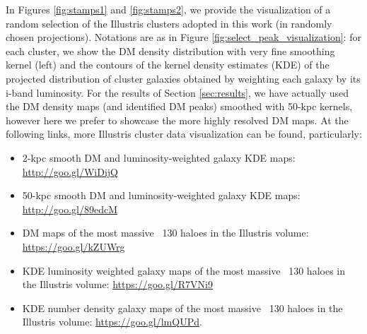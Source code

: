 \documentclass[usenatbib]{mn2e}
\begin{document}
{In Figures \ref{fig:stamps1} and \ref{fig:stamps2}, we provide the visualization of a random selection of the Illustris clusters adopted in this work (in randomly chosen projections). Notations are as in Figure \ref{fig:select_peak_visualization}: for each cluster, we show the DM density distribution with very fine smoothing kernel (left) and the contours of the kernel density estimates (KDE) of the projected distribution of cluster galaxies obtained by weighting each galaxy by its i-band luminosity. For the results of Section \ref{sec:results}, we have actually used the DM density maps (and identified DM peaks) smoothed with 50-kpc kernels, however here we prefer to showcase the more highly resolved DM maps. At the following links, more Illustris cluster data visualization can be found, particularly:

\begin{itemize}
\item 2-kpc smooth DM and luminosity-weighted galaxy KDE maps: \href{http://goo.gl/WiDijQ}{http://goo.gl/WiDijQ} 
\item 50-kpc smooth DM and luminosity-weighted galaxy KDE maps: \href{http://goo.gl/89edcM}{http://goo.gl/89edcM}
\item DM maps of the most massive ~130 haloes in the Illustris volume: \href{https://goo.gl/kZUWrg}{https://goo.gl/kZUWrg}
\item KDE luminosity weighted galaxy maps of the most massive ~130 haloes in the Illustris volume: \href{https://goo.gl/R7VNi9}{https://goo.gl/R7VNi9}
\item KDE number density galaxy maps of the most massive ~130 haloes in the Illustris volume: \href{https://goo.gl/lmQUPd}{https://goo.gl/lmQUPd}.

\end{itemize}

}
\end{document}
